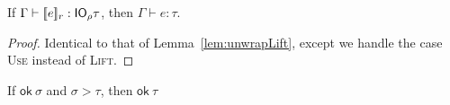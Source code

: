 \begin{lemma}\label{lem:unwrapUse}
  If $\Gamma \vdash \use{r}{e} : \IO_\rho \tau$, then $\Gamma \vdash e : \tau$.
\end{lemma}
\begin{proof}
  Identical to that of Lemma~\ref{lem:unwrapLift}, except we handle
  the case \textsc{Use} instead of \textsc{Lift}.
\end{proof}


\begin{lemma}
  If $\textsf{ok} \ \sigma$ and $\sigma > \tau$, then $\textsf{ok} \ \tau$
\end{lemma}
